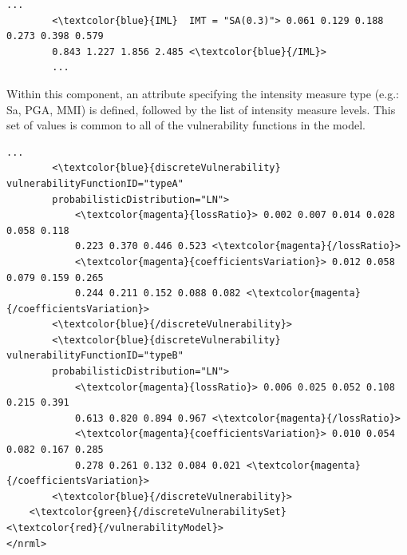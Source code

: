 \begin{Verbatim}[frame=single, commandchars=\\\{\}, samepage=true]
    ...
        <\textcolor{blue}{IML}  IMT = "SA(0.3)"> 0.061 0.129 0.188 0.273 0.398 0.579 
        0.843 1.227 1.856 2.485 <\textcolor{blue}{/IML}>
        ...
\end{Verbatim}

Within this component, an attribute specifying the intensity measure type (e.g.: Sa, PGA, MMI) is defined, followed by the list of intensity measure levels. This set of values is common to all of the \glspl{vulnerability function} in the model.

\begin{Verbatim}[frame=single, commandchars=\\\{\}, samepage=true]
        ...
        <\textcolor{blue}{discreteVulnerability}  vulnerabilityFunctionID="typeA" 
        probabilisticDistribution="LN">
            <\textcolor{magenta}{lossRatio}> 0.002 0.007 0.014 0.028 0.058 0.118
            0.223 0.370 0.446 0.523 <\textcolor{magenta}{/lossRatio}>
            <\textcolor{magenta}{coefficientsVariation}> 0.012 0.058 0.079 0.159 0.265
            0.244 0.211 0.152 0.088 0.082 <\textcolor{magenta}{/coefficientsVariation}>
        <\textcolor{blue}{/discreteVulnerability}>
        <\textcolor{blue}{discreteVulnerability}  vulnerabilityFunctionID="typeB"
        probabilisticDistribution="LN">
            <\textcolor{magenta}{lossRatio}> 0.006 0.025 0.052 0.108 0.215 0.391
            0.613 0.820 0.894 0.967 <\textcolor{magenta}{/lossRatio}>
            <\textcolor{magenta}{coefficientsVariation}> 0.010 0.054 0.082 0.167 0.285
            0.278 0.261 0.132 0.084 0.021 <\textcolor{magenta}{/coefficientsVariation}>
        <\textcolor{blue}{/discreteVulnerability}>
    <\textcolor{green}{/discreteVulnerabilitySet}
<\textcolor{red}{/vulnerabilityModel}>
</nrml>
\end{Verbatim}

